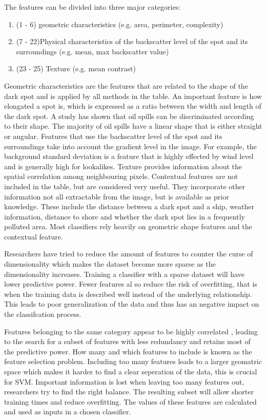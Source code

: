 The features can be divided into three major categories\cite{Brekke200595}:
\begin{enumerate}
\item (1 - 6) geometric characteristics (e.g. area, perimeter, complexity)
\item (7 - 22)Physical characteristics of the backscatter level of the spot and its surroundings (e.g. mean, max backscatter value)
\item (23 - 25) Texture (e.g. mean contrast)
\end{enumerate}

Geometric characteristics are the features that are related to the shape of the dark spot and is applied by all methods in the table\cite{Topouzelis200930}. An important feature is how elongated a spot is, which is expressed as a ratio between the width and length of the dark spot\cite{Gasull20071}. A study has shown that oil spills can be discriminated according to their shape\cite{Guo2014146}. The majority of oil spills have a linear shape that is either straight or angular\cite{Pavlakis200156}. Features that use the backscatter level of the spot and its surroundings take into account the gradient level in the image. For example, the background standard deviation is a feature that is highly effected by wind level and is generally high for lookalikes. Texture provides information about the spatial correlation among neighbouring pixels. Contextual features are not included in the table, but are considered very useful\cite{Topouzelis200930}. They incorporate other information not all extractable from the image, but is available as prior knowledge. These include the distance between a dark spot and a ship, weather information, distance to shore and whether the dark spot lies in a frequently polluted area. Most classifiers rely heavily on geometric shape features and the contextual feature.\cite{Xu201414}

Researchers have tried to reduce the amount of features to counter the curse of dimensionality which makes the dataset become more sparse as the dimensionality increases. Training a classifier with a sparse dataset will have lower predictive power. Fewer features al so reduce the risk of overfitting, that is when the training data is described well instead of the underlying relationship. This leads to poor generalization of the data and thus has an negative impact on the classifcation process.

Features belonging to the same category appear to be highly correlated \cite{Xu201414}, leading to the search for a subset of features with less redundancy and retains most of the predictive power. How many and which features to include is known as the feature selection problem. Including too many features leads to a larger geomatric space which makes it harder to find a clear seperation of the data, this is crucial for SVM. Important information is lost when leaving too many features out, researchers try to find the right balance. The resulting subset will allow shorter training times and reduce overfitting. The values of these features are calculated and used as inputs in a chosen classifier.
